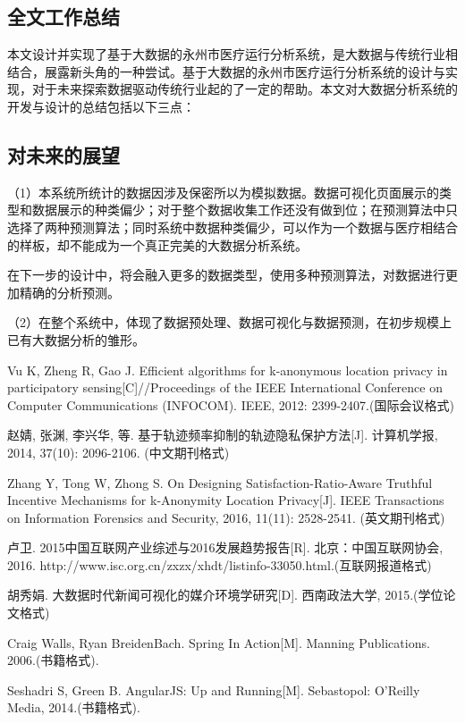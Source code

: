 \documentclass{husethesis}
\begin{document}
\subsection{全文工作总结}
本文设计并实现了基于大数据的永州市医疗运行分析系统，是大数据与传统行业相结合，展露新头角的一种尝试。基于大数据的永州市医疗运行分析系统的设计与实现，对于未来探索数据驱动传统行业起的了一定的帮助。本文对大数据分析系统的开发与设计的总结包括以下三点：

\subsection{对未来的展望}
（1）本系统所统计的数据因涉及保密所以为模拟数据。数据可视化页面展示的类型和数据展示的种类偏少；对于整个数据收集工作还没有做到位；在预测算法中只选择了两种预测算法；同时系统中数据种类偏少，可以作为一个数据与医疗相结合的样板，却不能成为一个真正完美的大数据分析系统。

在下一步的设计中，将会融入更多的数据类型，使用多种预测算法，对数据进行更加精确的分析预测。

（2）在整个系统中，体现了数据预处理、数据可视化与数据预测，在初步规模上已有大数据分析的雏形。
\clearpage

\begin{references}
  
 Vu K, Zheng R, Gao J. Efficient algorithms for k-anonymous location privacy in participatory sensing[C]//Proceedings of the IEEE International Conference on Computer Communications (INFOCOM). IEEE, 2012: 2399-2407.(国际会议格式)

 赵婧, 张渊, 李兴华, 等. 基于轨迹频率抑制的轨迹隐私保护方法[J]. 计算机学报, 2014, 37(10): 2096-2106. (中文期刊格式)

 Zhang Y, Tong W, Zhong S. On Designing Satisfaction-Ratio-Aware Truthful Incentive Mechanisms for k-Anonymity Location Privacy[J]. IEEE Transactions on Information Forensics and Security, 2016, 11(11): 2528-2541. (英文期刊格式)

 卢卫. 2015中国互联网产业综述与2016发展趋势报告[R]. 北京：中国互联网协会, 2016. http://www.isc.org.cn/zxzx/xhdt/listinfo-33050.html.(互联网报道格式)

 胡秀娟. 大数据时代新闻可视化的媒介环境学研究[D]. 西南政法大学, 2015.(学位论文格式)

 Craig Walls, Ryan BreidenBach. Spring In Action[M]. Manning Publications. 2006.(书籍格式).

 Seshadri S, Green B. AngularJS: Up and Running[M]. Sebastopol: O'Reilly Media, 2014.(书籍格式).

\end{references}
\end{document}
